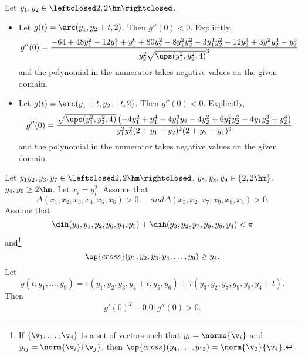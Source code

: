 \begin{calculation}\label{calc:2der}
Let $y_1,y_2\in \leftclosed 2,2\hm\rightclosed$.  
\begin{itemize}
\item 
Let $g(t) = \arc(y_1,y_2+t,2)$.  Then $g''(0) < 0$.
Explicitly,
\begin{displaymath}
  g''(0) = \dfrac{
    -64 + 48y_1^2 - 12 y_1^4 + y_1^6 
  + 80 y_2^2 - 8 y_1^2 y_2^2 - 3 y_1^4 y_2^2
    - 12 y_2 ^4 + 3 y_1^2 y_2^4 - y_2^6
  }{y_2^2 \sqrt{\ups(y_1^2,y_2^2,4)}^3}
\end{displaymath}
and the polynomial in the numerator takes negative values on the given
domain.
\item
Let $g(t) = \arc(y_1+t,y_2-t,2)$.  Then $g''(0) < 0$.
Explicitly,
\begin{displaymath}
  g''(0) = \dfrac{\sqrt{\ups(y_1^2,y_2^2,4)} \left(
      -4 y_1^2 + y_1^4 - 4y_1^3 y_2 - 4y_2^2 
   + 6 y_1^2 y_2^2 - 4 y_1 y_2^3 +y_2^4
    \right)}{y_1^2 y_2^2 (2+y_1-y_2)^2 (2+y_2-y_1)^2}
\end{displaymath}
and the polynomial in the numerator takes negative values on the given
domain.
\end{itemize}
\end{calculation}

\begin{calculation}\label{calc:cc:qua}  %
Let $y_1y_2,y_3,y_7\in \leftclosed 2,2\hm\rightclosed$,
$y_5,y_8,y_9\in \{2,2\hm\}$, $y_4,y_6\ge 2\hm$.
Let $x_i = y_i^2$.
Assume that
\begin{displaymath}
\Delta(x_1,x_2,x_3,x_4,x_5,x_6)>0,\quad{ and }
\Delta(x_3,x_2,x_7,x_9,x_8,x_4)>0.
\end{displaymath}
Assume that
\begin{displaymath}
\dih(y_3,y_1,y_2,y_6,y_4,y_5)+\dih(y_3,y_2,y_7,y_9,y_8,y_4) < \pi
\end{displaymath}
and\footnote{If $\{\v_1,\ldots,\v_4\}$ is a set of vectors such that
$y_i = \normo{\v_i}$ and $y_{ij} = \norm{\v_i}{\v_j}$, then
$\op{cross}(y_4,\ldots,y_{12}) = \norm{\v_2}{\v_4}$.}
\begin{displaymath}
\op{cross}(y_1,y_2,y_3,y_4,\ldots,y_9) \ge y_4.
\end{displaymath}
Let 
\begin{displaymath}g(t;y_1,\ldots,y_9) =
  \tau(y_1,y_2,y_3,y_4+t,y_5,y_6)+\tau(y_3,y_2,y_7,y_9,y_8,y_4+t).
\end{displaymath}
Then \begin{displaymath}g'(0)^2 - 0.01 g''(0) > 0.\end{displaymath}
\end{calculation}


